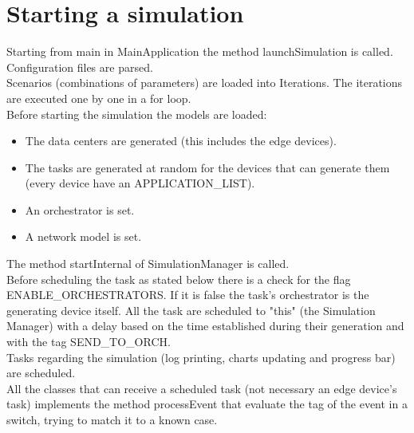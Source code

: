 \documentclass[12pt]{report}
\begin{document}
\section{Starting a simulation}
Starting from main in MainApplication the method launchSimulation is called.\\
Configuration files are parsed.\\
Scenarios (combinations of parameters) are loaded into Iterations.
The iterations are executed one by one in a for loop.\\
Before starting the simulation the models are loaded:
\begin{itemize}
	\item The data centers are generated (this includes the edge devices).
	\item The tasks are generated at random for the devices that can generate them (every device have an APPLICATION\_LIST).
	\item An orchestrator is set.
	\item A network model is set.
\end{itemize}
The method startInternal of SimulationManager is called.\\
Before scheduling the task as stated below there is a check for the flag ENABLE\_ORCHESTRATORS. If it is false the task's orchestrator is the generating device itself.
All the task are scheduled to "this" (the Simulation Manager) with a delay based on the time established during their generation and with the tag SEND\_TO\_ORCH.\\
Tasks regarding the simulation (log printing, charts updating and progress bar) are scheduled.\\
All the classes that can receive a scheduled task (not necessary an edge device's task) implements the method processEvent that evaluate the tag of the event in a switch, trying to match it to a known case.
\end{document}

